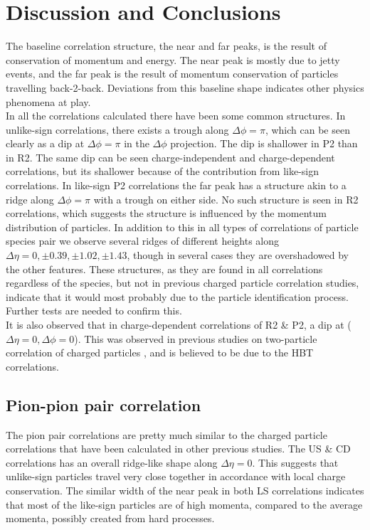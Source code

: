 \documentclass[12pt,a4paper,twoside]{report}
\begin{document}
\chapter{Discussion and Conclusions}\label{Ch:Conclusions}
The baseline correlation structure, the near and far peaks, is the result of conservation of momentum and energy. The near peak is mostly due to jetty events, and the far peak is the result of momentum conservation of particles travelling back-2-back. Deviations from this baseline shape indicates other physics phenomena at play.\\

In all the correlations calculated there have been some common structures. In unlike-sign correlations, there exists a trough along $\Delta\phi=\pi$, which can be seen clearly as a dip at $\Delta\phi=\pi$ in the $\Delta\phi$ projection. The dip is shallower in P2 than in R2. The same dip can be seen charge-independent and charge-dependent correlations, but its shallower because of the contribution from like-sign correlations. In like-sign P2 correlations the far peak has a structure akin to a ridge along $\Delta\phi=\pi$ with a trough on either side. No such structure is seen in R2 correlations, which suggests the structure is influenced by the momentum distribution of particles. In addition to this in all types of correlations of particle species pair we observe several ridges of different heights along $\Delta\eta=0, \pm0.39, \pm1.02, \pm1.43$, though in several cases they are overshadowed by the other features. These structures, as they are found in all correlations regardless of the species, but not in previous charged particle correlation studies, indicate that it would most probably due to the particle identification process. Further tests are needed to confirm this.\\

It is also observed that in charge-dependent correlations of R2 \& P2, a dip at ($\Delta\eta=0,\Delta\phi=0$). This was observed in previous studies on two-particle correlation of charged particles \cite{Ref:Baidya-paper}, and is believed to be due to the HBT correlations.
\section{Pion-pion pair correlation}
The pion pair correlations are pretty much similar to the charged particle correlations that have been calculated in other previous studies. The US \& CD correlations has an overall ridge-like shape along $\Delta\eta=0$. This suggests that unlike-sign particles travel very close together in accordance with local charge conservation. The similar width of the near peak in both LS correlations indicates that most of the like-sign particles are of high momenta, compared to the average momenta, possibly created from hard processes.
\end{document}
